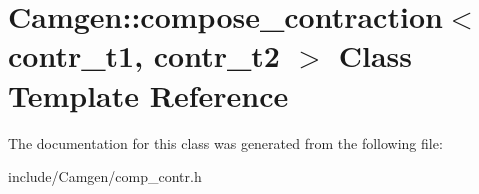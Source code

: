 \hypertarget{a00098}{\section{Camgen\-:\-:compose\-\_\-contraction$<$ contr\-\_\-t1, contr\-\_\-t2 $>$ Class Template Reference}
\label{a00098}
}


The documentation for this class was generated from the following file\-:\begin{DoxyCompactItemize}
\item 
include/\-Camgen/comp\-\_\-contr.\-h\end{DoxyCompactItemize}
